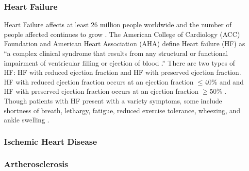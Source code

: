 \subsubsection{Heart Failure} 
Heart Failure affects at least 26 million people worldwide and the number of people affected continues to grow \cite{savarese_global_2017}. The American College of Cardiology (ACC) Foundation and American Heart Association (AHA) define Heart failure (HF) as “a complex clinical syndrome that results from any structural or functional impairment of ventricular filling or ejection of blood \cite{ziaeian_epidemiology_2016}.” There are two types of HF: HF with reduced ejection fraction and HF with preserved ejection fraction. HF with reduced ejection fraction occurs at an ejection fraction $\leq$40\% and and HF with preserved ejection fraction occurs at an ejection fraction $\geq$50\% \cite{ziaeian_epidemiology_2016}. Though patients with HF present with a variety symptoms, some include shortness of breath, lethargy, fatigue, reduced exercise tolerance, wheezing, and ankle swelling \cite{watson_clinical_2000}.

\subsubsection{Ischemic Heart Disease}
\subsubsection{Artherosclerosis}

